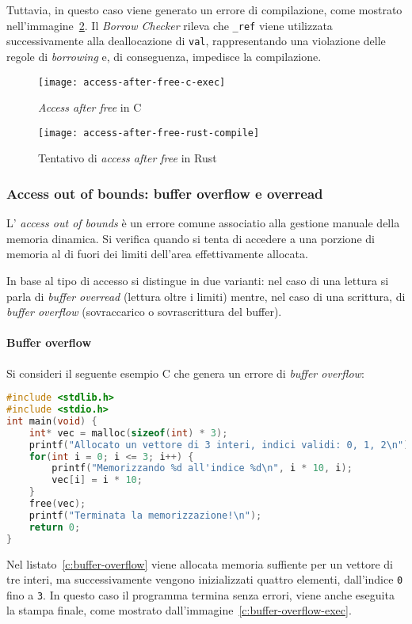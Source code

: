 Tuttavia, in questo caso viene generato un errore di compilazione, come mostrato nell'immagine~\ref{rust:access-after-free-compile}.
Il \textit{Borrow Checker} rileva che \texttt{\_ref} viene utilizzata successivamente alla deallocazione di \texttt{val}, rappresentando una violazione 
delle regole di \textit{borrowing} e, di conseguenza, impedisce la compilazione.
\begin{figure}[htbp]
\begin{center}
    \texttt{[image: access-after-free-c-exec]}
    \caption{\textit{Access after free} in C}\label{c:access-after-free-exec}
    \end{center}
\end{figure}
\begin{figure}[htbp]
\begin{center}
    \texttt{[image: access-after-free-rust-compile]}
    \caption{Tentativo di \textit{access after free} in Rust}\label{rust:access-after-free-compile}
    \end{center}
\end{figure}

\subsubsection{Access out of bounds: buffer overflow e overread}
L' \textit{access out of bounds} è un errore comune associatio alla gestione manuale della memoria dinamica.
Si verifica quando si tenta di accedere a una porzione di memoria al di fuori dei limiti dell'area effettivamente allocata.

In base al tipo di accesso si distingue in due varianti: nel caso di una lettura si parla di \textit{buffer overread} 
(lettura oltre i limiti) mentre, nel caso di una scrittura, di \textit{buffer overflow} (sovraccarico o sovrascrittura del buffer).

\paragraph{Buffer overflow}
Si consideri il seguente esempio C che genera un errore di \textit{buffer overflow}:
\begin{lstlisting}[language=C, caption={Buffer overflow in C}, label={c:buffer-overflow}]
#include <stdlib.h>
#include <stdio.h>
int main(void) {
    int* vec = malloc(sizeof(int) * 3);
    printf("Allocato un vettore di 3 interi, indici validi: 0, 1, 2\n");
    for(int i = 0; i <= 3; i++) {
        printf("Memorizzando %d all'indice %d\n", i * 10, i);
        vec[i] = i * 10;
    }
    free(vec);
    printf("Terminata la memorizzazione!\n");
    return 0;
}
\end{lstlisting}
Nel listato~\ref{c:buffer-overflow} viene allocata memoria suffiente per un vettore di tre interi, ma successivamente vengono
inizializzati quattro elementi, dall'indice \texttt{0} fino a \texttt{3}.
In questo caso il programma termina senza errori, viene anche eseguita la stampa finale, come mostrato dall'immagine~\ref{c:buffer-overflow-exec}. 

